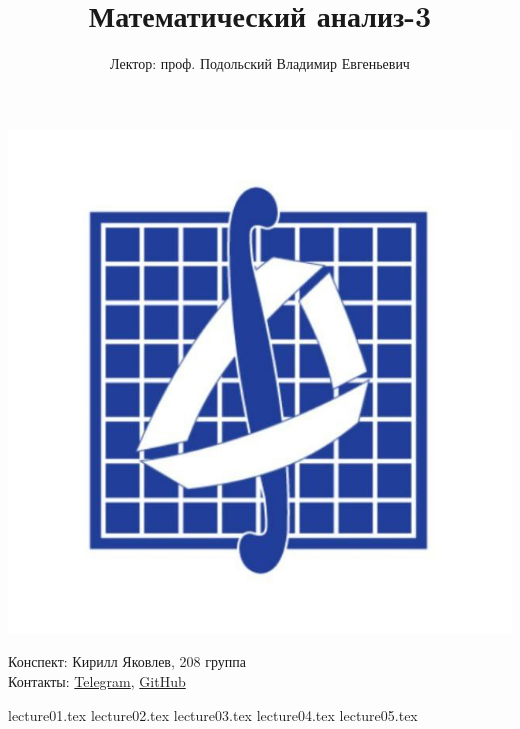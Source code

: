 \documentclass[a4paper, 12pt]{article}
\title{\textbf{Математический анализ-3}}
\author{Лектор: проф. Подольский Владимир Евгеньевич}
\begin{document}
    
\fontsize{14pt}{20pt}\selectfont
\maketitle
\vspace{0.3cm}
\begin{center}
    \includegraphics[width=0.75\linewidth]{Images/mehmat.png}
\end{center}
\vspace{1.5cm}
\begin{center}
    Конспект: Кирилл Яковлев, 208 группа\\
    Контакты: \href{https://t.me/fourkenz}{Telegram}, \href{https://github.com/yakovlevki}{GitHub}\\
\end{center}
    
\newpage
\tableofcontents
\newpage

{lecture01.tex}
{lecture02.tex}
{lecture03.tex}
{lecture04.tex}
{lecture05.tex}
\end{document}
